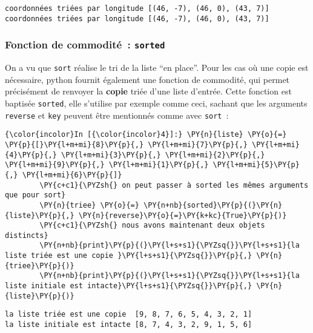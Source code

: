     \begin{Verbatim}[commandchars=\\\{\}]
coordonnées triées par longitude [(46, -7), (46, 0), (43, 7)]
coordonnées triées par longitude [(46, -7), (46, 0), (43, 7)]

    \end{Verbatim}

    \hypertarget{fonction-de-commodituxe9-sorted}{%
\subsubsection{\texorpdfstring{Fonction de commodité~:
\texttt{sorted}}{Fonction de commodité~: sorted}}\label{fonction-de-commodituxe9-sorted}}

    On a vu que \texttt{sort} réalise le tri de la liste ``en place''. Pour
les cas où une copie est nécessaire, python fournit également une
fonction de commodité, qui permet précisément de renvoyer la
\textbf{copie} triée d'une liste d'entrée. Cette fonction est baptisée
\texttt{sorted}, elle s'utilise par exemple comme ceci, sachant que les
arguments \texttt{reverse} et \texttt{key} peuvent être mentionnés comme
avec \texttt{sort}~:

    \begin{Verbatim}[commandchars=\\\{\}]
{\color{incolor}In [{\color{incolor}4}]:} \PY{n}{liste} \PY{o}{=} \PY{p}{[}\PY{l+m+mi}{8}\PY{p}{,} \PY{l+m+mi}{7}\PY{p}{,} \PY{l+m+mi}{4}\PY{p}{,} \PY{l+m+mi}{3}\PY{p}{,} \PY{l+m+mi}{2}\PY{p}{,} \PY{l+m+mi}{9}\PY{p}{,} \PY{l+m+mi}{1}\PY{p}{,} \PY{l+m+mi}{5}\PY{p}{,} \PY{l+m+mi}{6}\PY{p}{]}
        \PY{c+c1}{\PYZsh{} on peut passer à sorted les mêmes arguments que pour sort}
        \PY{n}{triee} \PY{o}{=} \PY{n+nb}{sorted}\PY{p}{(}\PY{n}{liste}\PY{p}{,} \PY{n}{reverse}\PY{o}{=}\PY{k+kc}{True}\PY{p}{)}
        \PY{c+c1}{\PYZsh{} nous avons maintenant deux objets distincts}
        \PY{n+nb}{print}\PY{p}{(}\PY{l+s+s1}{\PYZsq{}}\PY{l+s+s1}{la liste triée est une copie }\PY{l+s+s1}{\PYZsq{}}\PY{p}{,} \PY{n}{triee}\PY{p}{)}
        \PY{n+nb}{print}\PY{p}{(}\PY{l+s+s1}{\PYZsq{}}\PY{l+s+s1}{la liste initiale est intacte}\PY{l+s+s1}{\PYZsq{}}\PY{p}{,} \PY{n}{liste}\PY{p}{)}
\end{Verbatim}


    \begin{Verbatim}[commandchars=\\\{\}]
la liste triée est une copie  [9, 8, 7, 6, 5, 4, 3, 2, 1]
la liste initiale est intacte [8, 7, 4, 3, 2, 9, 1, 5, 6]

    \end{Verbatim}

